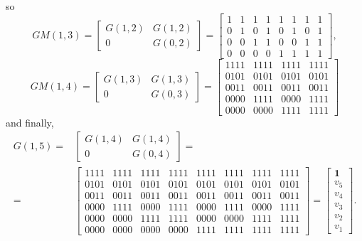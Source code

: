 \documentclass[english,bachelor]{liumaiex}
\begin{document}
so
\begin{displaymath}
GM(1,3)=
\begin{bmatrix}
G(1,2) 	& G(1,2)\\
0		& G(0,2)
\end{bmatrix}
=
\begin{bmatrix}
1 & 1 & 1 & 1 & 1 & 1 & 1 & 1\\
0 & 1 & 0 & 1 & 0 & 1 & 0 & 1\\
0 & 0 & 1 & 1 & 0 & 0 & 1 & 1\\
0 & 0 & 0 & 0 & 1 & 1 & 1 & 1
\end{bmatrix},
\end{displaymath}
\begin{displaymath}
GM(1,4)=
\begin{bmatrix}
G(1,3) 	& G(1,3)\\
0		& G(0,3)
\end{bmatrix}
=
\begin{bmatrix}
1111 & 1111 & 1111 & 1111\\
0101 & 0101 & 0101 & 0101\\
0011 & 0011 & 0011 & 0011\\
0000 & 1111 & 0000 & 1111\\
0000 & 0000 & 1111 & 1111
\end{bmatrix}
\end{displaymath}
and finally,
\begin{align*}
G(1,5)=&
\begin{bmatrix}
G(1,4) 	& G(1,4)\\
0		& G(0,4)
\end{bmatrix}
=\\
=&
\begin{bmatrix}
1111 & 1111 & 1111 & 1111 & 1111 & 1111 & 1111 & 1111\\
0101 & 0101 & 0101 & 0101 & 0101 & 0101 & 0101 & 0101\\
0011 & 0011 & 0011 & 0011 & 0011 & 0011 & 0011 & 0011\\
0000 & 1111 & 0000 & 1111 & 0000 & 1111 & 0000 & 1111\\
0000 & 0000 & 1111 & 1111 & 0000 & 0000 & 1111 & 1111\\
0000 & 0000 & 0000 & 0000 & 1111 & 1111 & 1111 & 1111
\end{bmatrix}
=
\begin{bmatrix}
\mathbf{1}\\
v_5\\
v_4\\
v_3\\
v_2\\
v_1
\end{bmatrix}.
\end{align*}
\end{document}

